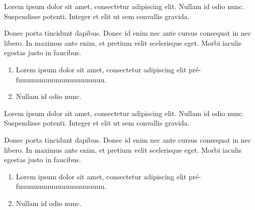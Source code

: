 \documentclass{article}
\begin{document}
\begin{callout}[parbox=false]

  Lorem ipsum dolor sit amet, consectetur adipiscing elit. Nullam id odio nunc.
  Suspendisse potenti. Integer et elit ut sem convallis gravida.

  Donec porta tincidunt dapibus. Donec id enim nec ante cursus consequat in nec libero. In maximus ante enim, et pretium velit scelerisque eget. Morbi iaculis egestas justo in faucibus.

  \begin{enumerate}
  \item Lorem ipsum dolor sit amet, consectetur adipiscing elit pré-fuuuuuuuuuuuuuuuuuuuuuu.
  \item Nullam id odio nunc.
  \end{enumerate}
\end{callout}

\begin{callout}[hyphenationfix=true]
  Lorem ipsum dolor sit amet, consectetur adipiscing elit. Nullam id odio nunc.
  Suspendisse potenti. Integer et elit ut sem convallis gravida.

  Donec porta tincidunt dapibus. Donec id enim nec ante cursus consequat in nec libero. In maximus ante enim, et pretium velit scelerisque eget. Morbi iaculis egestas justo in faucibus.

  \begin{enumerate}
  \item Lorem ipsum dolor sit amet, consectetur adipiscing elit pré-fuuuuuuuuuuuuuuuuuuuuuu.
  \item Nullam id odio nunc.
  \end{enumerate}
\end{callout}
\end{document}
